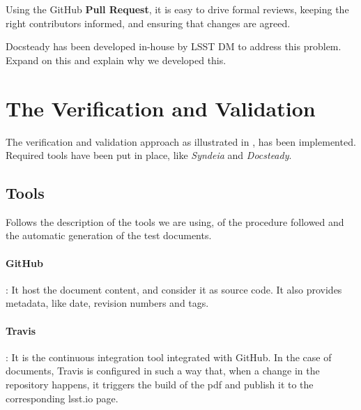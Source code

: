 Using the GitHub \textbf{Pull Request}, it is easy to drive formal reviews, keeping the right contributors informed,
and ensuring that changes are agreed.

Docsteady has been developed in-house by LSST DM to address this problem. Expand on this and explain why 
we developed this. 






\section{The Verification and Validation}

The verification and validation approach as illustrated in \cite{10.1117/12.2310125} , has been implemented.
Required tools have been put in place, like \textit{Syndeia} and \textit{Docsteady}.


\subsection{Tools}

Follows the description of the tools we are using, of the procedure followed and the automatic generation of the test documents.

\paragraph{GitHub}:
It host the document content, and consider it as source code. It also provides metadata, like date, revision numbers and tags.

\paragraph{Travis}:
It is the continuous integration tool integrated with GitHub.
In the case of documents, Travis is configured in such a way that, when a change in the repository happens, 
it triggers the build of the pdf and publish it to the corresponding lsst.io page.

